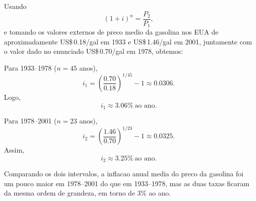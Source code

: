 Usando
\[
(1+i)^n=\frac{P_2}{P_1},
\]
e tomando os valores externos de preco medio da gasolina nos EUA de aproximadamente US\$\,0.18/gal em 1933 e US\$\,1.46/gal em 2001, juntamente com o valor dado no enunciado US\$\,0.70/gal em 1978, obtemos:

Para 1933--1978 ($n=45$ anos),
\[
i_1=\left(\frac{0.70}{0.18}\right)^{1/45}-1\approx0.0306.
\]
Logo,
\[
i_1\approx 3.06\%\ \text{ao ano}.
\]

Para 1978--2001 ($n=23$ anos),
\[
i_2=\left(\frac{1.46}{0.70}\right)^{1/23}-1\approx0.0325.
\]
Assim,
\[
i_2\approx 3.25\%\ \text{ao ano}.
\]

Comparando os dois intervalos, a inflacao anual media do preco da gasolina foi um pouco maior em 1978--2001 do que em 1933--1978, mas as duas taxas ficaram da mesma ordem de grandeza, em torno de $3\%$ ao ano.